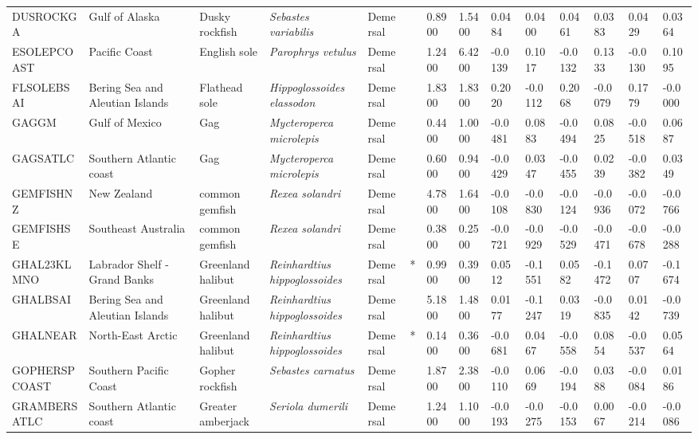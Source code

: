 \begin{longtable}{p{2.8cm}p{2cm}p{1.7cm}p{1.7cm}p{1cm}p{0.3cm}p{1cm}p{1cm}p{1cm}p{1cm}p{1cm}p{1cm}p{1cm}p{1cm}}
  DUSROCKGA & Gulf of Alaska & Dusky rockfish & \textit{Sebastes variabilis} & Demersal &   & 0.8900 & 1.5400 & 0.0484 & 0.0400 & 0.0461 & 0.0383 & 0.0429 & 0.0364 \\ 
  ESOLEPCOAST & Pacific Coast & English sole & \textit{Parophrys vetulus} & Demersal &   & 1.2400 & 6.4200 & -0.0139 & 0.1017 & -0.0132 & 0.1333 & -0.0130 & 0.1095 \\ 
  FLSOLEBSAI & Bering Sea and Aleutian Islands & Flathead sole & \textit{Hippoglossoides elassodon} & Demersal &   & 1.8300 & 1.8300 & 0.2020 & -0.0112 & 0.2068 & -0.0079 & 0.1779 & -0.0000 \\ 
  GAGGM & Gulf of Mexico & Gag & \textit{Mycteroperca microlepis} & Demersal &   & 0.4400 & 1.0000 & -0.0481 & 0.0883 & -0.0494 & 0.0825 & -0.0518 & 0.0687 \\ 
  GAGSATLC & Southern Atlantic coast & Gag & \textit{Mycteroperca microlepis} & Demersal &   & 0.6000 & 0.9400 & -0.0429 & 0.0347 & -0.0455 & 0.0239 & -0.0382 & 0.0349 \\ 
  GEMFISHNZ & New Zealand & common gemfish & \textit{Rexea solandri} & Demersal &   & 4.7800 & 1.6400 & -0.0108 & -0.0830 & -0.0124 & -0.0936 & -0.0072 & -0.0766 \\ 
  GEMFISHSE & Southeast Australia & common gemfish & \textit{Rexea solandri} & Demersal &   & 0.3800 & 0.2500 & -0.0721 & -0.0929 & -0.0529 & -0.0471 & -0.0678 & -0.0288 \\ 
  GHAL23KLMNO & Labrador Shelf - Grand Banks & Greenland halibut & \textit{Reinhardtius hippoglossoides} & Demersal & * & 0.9900 & 0.3900 & 0.0512 & -0.1551 & 0.0582 & -0.1472 & 0.0707 & -0.1674 \\ 
  GHALBSAI & Bering Sea and Aleutian Islands & Greenland halibut & \textit{Reinhardtius hippoglossoides} & Demersal &   & 5.1800 & 1.4800 & 0.0177 & -0.1247 & 0.0319 & -0.0835 & 0.0142 & -0.0739 \\ 
  GHALNEAR & North-East Arctic & Greenland halibut & \textit{Reinhardtius hippoglossoides} & Demersal & * & 0.1400 & 0.3600 & -0.0681 & 0.0467 & -0.0558 & 0.0854 & -0.0537 & 0.0564 \\ 
  GOPHERSPCOAST & Southern Pacific Coast & Gopher rockfish & \textit{Sebastes carnatus} & Demersal &   & 1.8700 & 2.3800 & -0.0110 & 0.0669 & -0.0194 & 0.0388 & -0.0084 & 0.0186 \\ 
  GRAMBERSATLC & Southern Atlantic coast & Greater amberjack & \textit{Seriola dumerili} & Demersal &   & 1.2400 & 1.1000 & -0.0193 & -0.0275 & -0.0153 & 0.0067 & -0.0214 & -0.0086 \\ 

\end{longtable}
